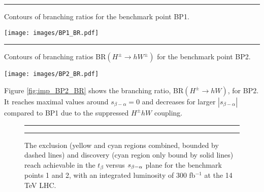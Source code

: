 \begin{marginfigure}[-3in]
 \hrule
 \vspace{\onelineskip}
 \caption{Contours of branching ratios for the benchmark point BP1.}
 \texttt{[image: images/BP1\_BR.pdf]}
\label{fig:imp_BP1_BR}
\end{marginfigure}

\begin{marginfigure}
 \centering
 \hrule
 \vspace{\onelineskip}
\caption{Contours of branching ratios BR$(H^\pm\rightarrow hW^\pm)$ for the benchmark point BP2.}
\texttt{[image: images/BP2\_BR.pdf]}
\label{fig:imp_BP2_BR}
\end{marginfigure}

Figure \ref{fig:imp_BP2_BR} shows the branching ratio, BR$(H^{\pm} \rightarrow hW)$, for BP2. It reaches maximal values around $s_{\beta-\alpha}=0$ and decreases for larger $|s_{\beta-\alpha}|$ compared to BP1 due to the suppressed $H^{\pm} hW$ coupling. 

\begin{figure}
 \centering
 \hrule
 \vspace{\onelineskip}
 \caption{The exclusion (yellow and cyan regions combined, bounded by dashed lines) and discovery (cyan region only bound by solid lines) reach achievable in the $t_{\beta}$ versus $s_{\beta-\alpha}$ plane for the benchmark points 1 and 2, with an integrated luminosity of 300 fb$^{-1}$ at the 14 TeV LHC.}
\label{fig:imp_BP_Lim}
 \vspace{\onelineskip}
\hrule
\end{figure}

